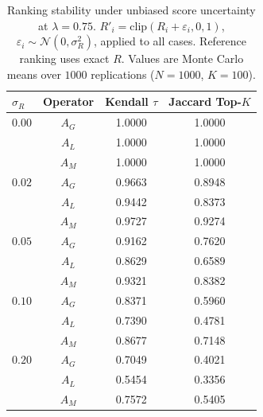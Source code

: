 \begin{table}[H]
\caption{Ranking stability under unbiased score uncertainty at $\lambda=0.75$. $R'_i = \mathrm{clip}(R_i + \varepsilon_i, 0, 1)$, $\varepsilon_i \sim \mathcal{N}(0, \sigma_R^2)$, applied to all cases. Reference ranking uses exact $R$. Values are Monte Carlo means over $1000$ replications ($N=1000$, $K=100$).}
\label{tab:score-stability}
\centering\small\renewcommand{\arraystretch}{1.2}
\begin{tabular}{lccc}
\toprule
$\sigma_R$ & Operator & Kendall $\tau$ & Jaccard Top-$K$ \\
\midrule
$0.00$ & $A_G$ & 1.0000 & 1.0000 \\
 & $A_L$ & 1.0000 & 1.0000 \\
 & $A_M$ & 1.0000 & 1.0000 \\
\midrule
$0.02$ & $A_G$ & 0.9663 & 0.8948 \\
 & $A_L$ & 0.9442 & 0.8373 \\
 & $A_M$ & 0.9727 & 0.9274 \\
\midrule
$0.05$ & $A_G$ & 0.9162 & 0.7620 \\
 & $A_L$ & 0.8629 & 0.6589 \\
 & $A_M$ & 0.9321 & 0.8382 \\
\midrule
$0.10$ & $A_G$ & 0.8371 & 0.5960 \\
 & $A_L$ & 0.7390 & 0.4781 \\
 & $A_M$ & 0.8677 & 0.7148 \\
\midrule
$0.20$ & $A_G$ & 0.7049 & 0.4021 \\
 & $A_L$ & 0.5454 & 0.3356 \\
 & $A_M$ & 0.7572 & 0.5405 \\
\bottomrule
\end{tabular}
\end{table}

